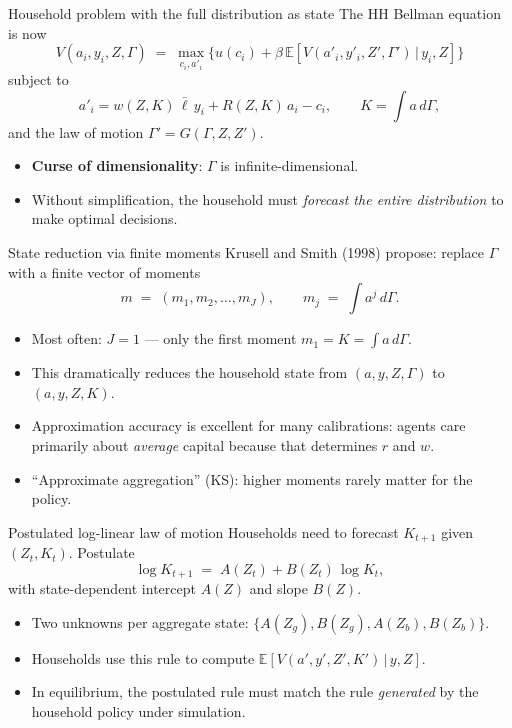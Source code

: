 \documentclass[10pt,english,aspectratio=169]{beamer}
\begin{document}
\begin{frame}{Household problem with the full distribution as state}
The HH Bellman equation is now
\[
V(a_i, y_i, Z, \Gamma) \;=\; \max_{c_i, a'_i}
\big\{u(c_i) + \beta\,\mathbb{E}\!\left[V(a'_i, y'_i, Z', \Gamma')\,\big|\,y_i, Z\right]\big\}
\]
subject to
\[
a'_{i} = w(Z,K)\,\bar\ell\, y_i + R(Z,K)\,a_i - c_i, \qquad K = \int a\,d\Gamma,
\]
and the law of motion $\Gamma' = G(\Gamma, Z, Z')$.
\medskip
\begin{itemize}
\item \textbf{Curse of dimensionality}: $\Gamma$ is infinite-dimensional.
\item Without simplification, the household must \emph{forecast the entire distribution} to make optimal decisions.
\end{itemize}
\end{frame}

\begin{frame}{State reduction via finite moments}
Krusell and Smith (1998) propose: replace $\Gamma$ with a finite vector of moments
\[
m \;=\; (m_1, m_2, \ldots, m_J), \qquad m_j \;=\; \int a^j\, d\Gamma.
\]
\medskip
\begin{itemize}
\item Most often: $J = 1$ --- only the first moment $m_1 = K = \int a\,d\Gamma$.
\medskip
\item This dramatically reduces the household state from $(a,y,Z,\Gamma)$ to $(a,y,Z,K)$.
\medskip
\item Approximation accuracy is excellent for many calibrations: agents care primarily about \emph{average} capital because that determines $r$ and $w$.
\medskip
\item ``Approximate aggregation'' (KS): higher moments rarely matter for the policy.
\end{itemize}
\end{frame}

\begin{frame}{Postulated log-linear law of motion}
Households need to forecast $K_{t+1}$ given $(Z_t, K_t)$. Postulate
\[
\log K_{t+1} \;=\; A(Z_t) + B(Z_t)\,\log K_t,
\]
with state-dependent intercept $A(Z)$ and slope $B(Z)$.
\medskip
\begin{itemize}
\item Two unknowns per aggregate state: $\{A(Z_g), B(Z_g), A(Z_b), B(Z_b)\}$.
\item Households use this rule to compute $\mathbb{E}[V(a',y',Z',K')\,|\,y,Z]$.
\item In equilibrium, the postulated rule must match the rule \emph{generated} by the household policy under simulation.
\end{itemize}
\end{frame}
\end{document}
